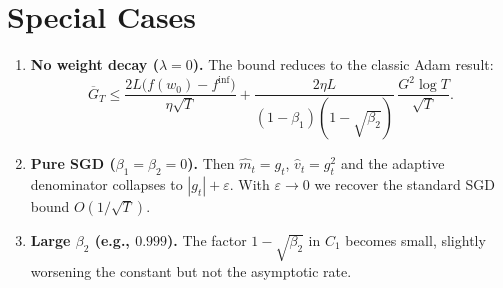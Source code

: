 \documentclass{article}
\begin{document}
\section*{Special Cases}
\begin{enumerate}
\item \textbf{No weight decay ($\lambda=0$).} The bound reduces to the classic Adam result:
\[
\overline{G}_{T}\le
\frac{2L\big(f(w_{0})-f^{\inf}\big)}{\eta\sqrt{T}}
+\frac{2\eta L}{(1-\beta_{1})(1-\sqrt{\beta_{2}})}\,
  \frac{G^{2}\log T}{\sqrt{T}}.
\]
\item \textbf{Pure SGD ($\beta_{1}=\beta_{2}=0$).} Then $\hat m_{t}=g_{t}$, $\hat v_{t}=g_{t}^{2}$ and the adaptive denominator collapses to $|g_{t}|+\varepsilon$. With $\varepsilon\to0$ we recover the standard SGD bound $O(1/\sqrt{T})$.
\item \textbf{Large $\beta_{2}$ (e.g., $0.999$).} The factor $1-\sqrt{\beta_{2}}$ in $C_{1}$ becomes small, slightly worsening the constant but not the asymptotic rate.
\end{enumerate}
\end{document}
